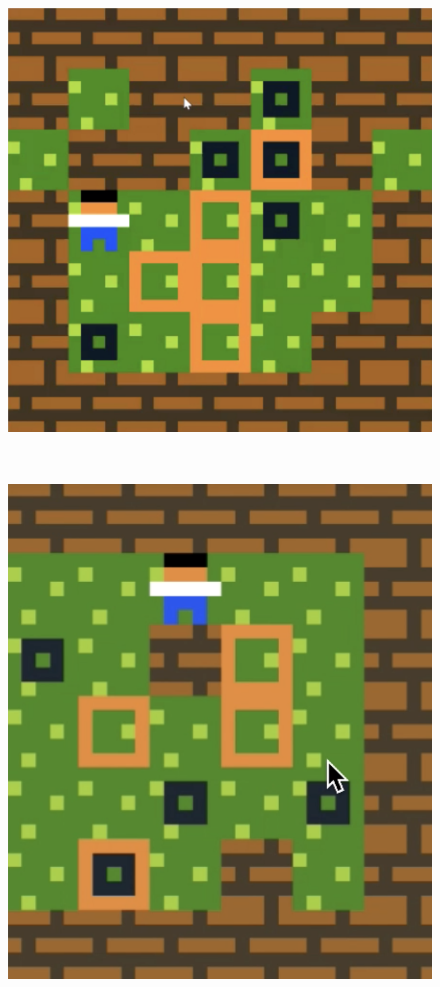 \begin{figure}[!htbp]
\begin{minipage}[t]{0.2\textwidth}
\end{minipage}
$\:$
\begin{minipage}[t]{0.2\textwidth}
\includegraphics[width=\textwidth]{figures/finaldesign4_1.png} \hfill \\
\end{minipage}
$\:$
\begin{minipage}[t]{0.2\textwidth}
\includegraphics[width=\textwidth]{figures/finaldesign5_1.png} \hfill \\

\end{minipage}
\end{figure}
